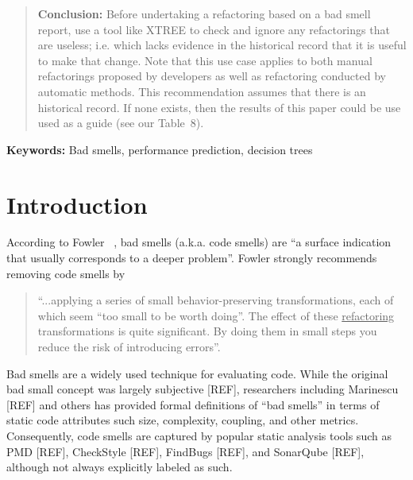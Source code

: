 \documentclass[twocolumn,5p]{elsarticle}
\theoremstyle{break}
\begin{document}
\begin{frontmatter}
\begin{abstract}
			\noindent
			{\bf Conclusion: }
			Before undertaking a refactoring based on a bad smell report,
			use a tool like XTREE to check and ignore any refactorings   that  are useless; i.e. which lacks evidence
			in the historical record  that it is useful to make that change.
			Note that this use case applies to both manual refactorings proposed by developers
			as well as refactoring  conducted by automatic methods.
			This recommendation assumes that there is an historical record.
			If none exists, then the results of this paper could be use used as a guide (see our
			Table~8). 
			
			
		\end{abstract}
	\end{frontmatter}
	
	\vspace{1mm}
	\noindent
	{\bf Keywords:} Bad smells,
	performance prediction,  decision trees 
	
	
	
	
	\section{Introduction}
	
	According to   Fowler ~\cite{fowler99}, bad smells (a.k.a. code smells)
	are ``a surface indication that usually corresponds to a deeper problem''.
	Fowler strongly recommends   removing   code smells   by
	\begin{quote}
		``...applying a series of small behavior-preserving transformations, each 
		of which seem ``too small to be worth doing''. 
		The  effect of   these \underline{refactoring} transformations is quite significant. By doing them in small steps you reduce the risk 
		of introducing errors''.
	\end{quote}
	
	Bad smells are a widely used technique for evaluating code. While the original bad small concept was largely subjective [REF], researchers including Marinescu [REF] and others has provided formal definitions of ``bad smells'' in terms of static code attributes such size, complexity, coupling, and other metrics. Consequently, code smells are captured by popular static analysis tools such as PMD [REF], CheckStyle [REF], FindBugs [REF], and SonarQube [REF], although not always explicitly labeled as such. 
	
\end{document}
